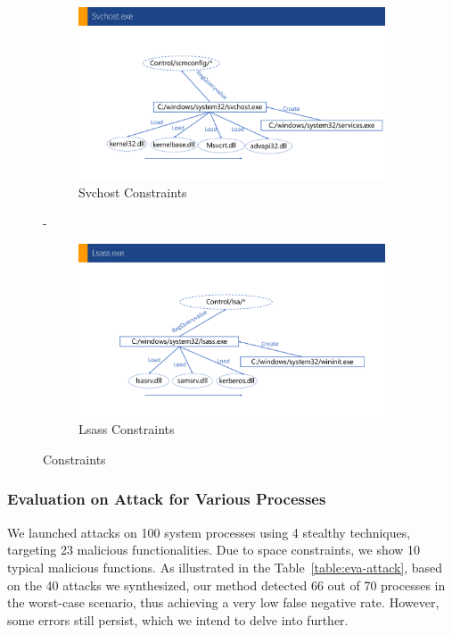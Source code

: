 \begin{figure}
\begin{minipage}[b]{0.34\textwidth}
  \begin{subfigure}{.99\textwidth}
      \includegraphics[width=\textwidth]{figs/svchost.pdf}
      \caption{Svchost Constraints}
      \label{fig:svc-cons}
  \end{subfigure}
  \hfill
  -\vspace{0.9cm}
  \begin{subfigure}{.99\textwidth}
      \includegraphics[width=\textwidth]{figs/lsass.pdf}
      \caption{Lsass Constraints}
      \label{fig:lsass-cons}
  \end{subfigure}
\caption{Constraints}
\label{fig-fdh}
\end{minipage}
\end{figure}

\subsubsection{Evaluation on Attack for Various Processes}

We launched attacks on 100 system processes using 4 stealthy techniques, targeting 23 malicious functionalities. Due to space constraints, we show 10 typical malicious functions.
As illustrated in the Table~\ref{table:eva-attack}, based on the 40 attacks we synthesized, our method detected 66 out of 70 processes in the worst-case scenario, thus achieving a very low false negative rate.
However, some errors still persist, which we intend to delve into further.


